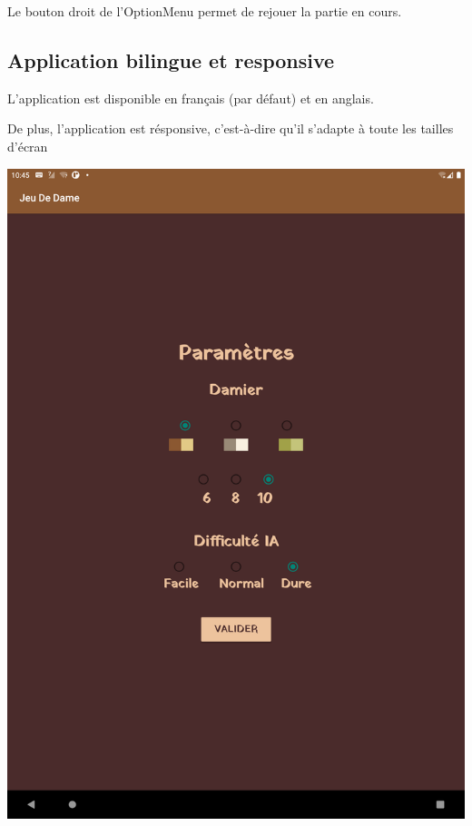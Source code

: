 \documentclass{article}
\begin{document}
Le bouton droit de l'OptionMenu permet de rejouer la partie en cours.

\subsection{Application bilingue et responsive}

L'application est disponible en français (par défaut) et en anglais.

De plus, l'application est résponsive, c'est-à-dire qu'il s'adapte à toute les tailles d'écran

\begin{center}
  \includegraphics[scale=0.1]{setting_tablet_fr.png}

\end{center}
\end{document}
